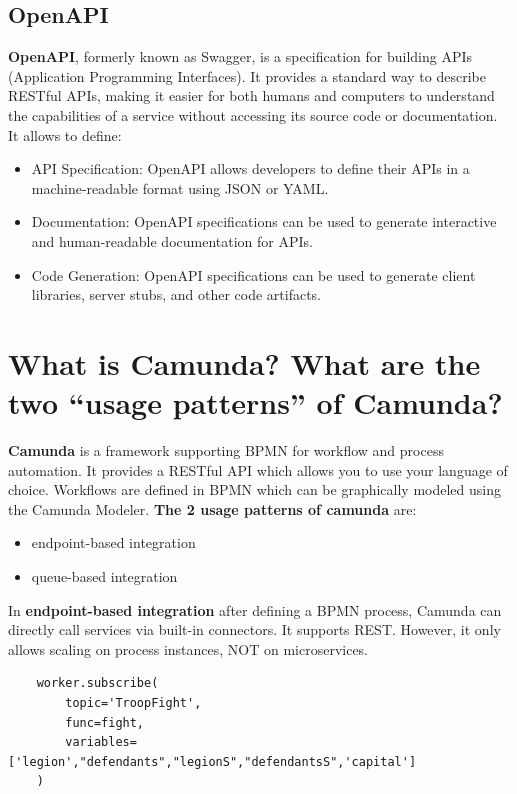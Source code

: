 \subsection{OpenAPI}
\textbf{OpenAPI}, formerly known as Swagger, is a specification for building APIs (Application Programming Interfaces). It provides a standard way to describe RESTful APIs, making it easier for both humans and computers to understand the capabilities of a service without accessing its source code or documentation. It allows to define:
\begin{itemize}
   \item API Specification: OpenAPI allows developers to define their APIs in a machine-readable format using JSON or YAML.
   \item Documentation: OpenAPI specifications can be used to generate interactive and human-readable documentation for APIs.
   \item Code Generation: OpenAPI specifications can be used to generate client libraries, server stubs, and other code artifacts.
\end{itemize}

\section{What is Camunda? What are the two “usage patterns” of Camunda?}

\textbf{Camunda} is a framework supporting BPMN for workflow and process automation.
It provides a RESTful API which allows you to use your language of choice.
Workflows are defined in BPMN which can be graphically modeled using the Camunda Modeler.
\textbf{The 2 usage patterns of camunda} are:
\begin{itemize}
   \item endpoint-based integration
   \item queue-based integration
\end{itemize}
In \textbf{endpoint-based integration} after defining a BPMN process, Camunda can directly call services via built-in connectors. It supports REST. However, it only allows scaling on process instances, NOT on microservices.

{
   \footnotesize\color{gray}
   \begin{verbatim}
    worker.subscribe(
        topic='TroopFight',
        func=fight,
        variables=['legion',"defendants","legionS","defendantsS",'capital']
    )
\end{verbatim}
}

